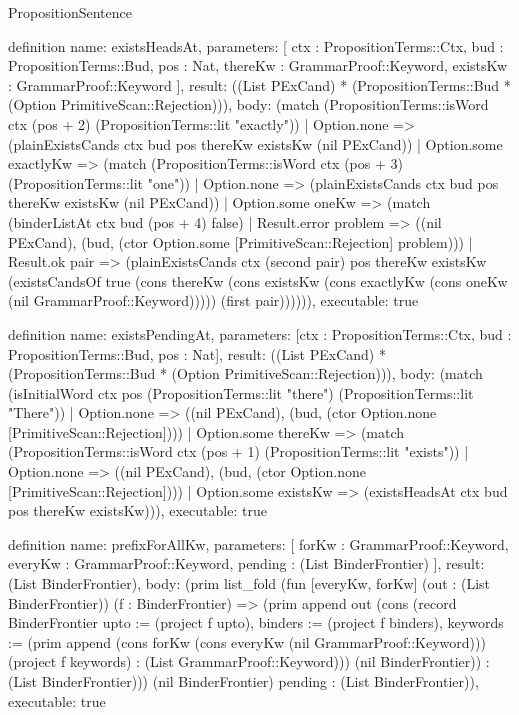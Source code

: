 \begin{lexlean}{PropositionSentence}
\begin{semanticmodule}
definition{
  name: existsHeadsAt,
  parameters: [
    ctx : PropositionTerms::Ctx,
    bud : PropositionTerms::Bud,
    pos : Nat,
    thereKw : GrammarProof::Keyword,
    existsKw : GrammarProof::Keyword
  ],
  result: ((List PExCand) * (PropositionTerms::Bud * (Option PrimitiveScan::Rejection))),
  body: (match (PropositionTerms::isWord ctx (pos + 2) (PropositionTerms::lit "exactly"))
    | Option.none => (plainExistsCands ctx bud pos thereKw existsKw (nil PExCand))
    | Option.some exactlyKw => (match (PropositionTerms::isWord ctx (pos + 3) (PropositionTerms::lit "one"))
        | Option.none => (plainExistsCands ctx bud pos thereKw existsKw (nil PExCand))
        | Option.some oneKw => (match (binderListAt ctx bud (pos + 4) false)
            | Result.error problem => ((nil PExCand), (bud, (ctor Option.some [PrimitiveScan::Rejection] problem)))
            | Result.ok pair => (plainExistsCands ctx (second pair) pos thereKw existsKw (existsCandsOf true (cons thereKw (cons existsKw (cons exactlyKw (cons oneKw (nil GrammarProof::Keyword))))) (first pair)))))),
  executable: true
}

definition{
  name: existsPendingAt,
  parameters: [ctx : PropositionTerms::Ctx, bud : PropositionTerms::Bud, pos : Nat],
  result: ((List PExCand) * (PropositionTerms::Bud * (Option PrimitiveScan::Rejection))),
  body: (match (isInitialWord ctx pos (PropositionTerms::lit "there") (PropositionTerms::lit "There"))
    | Option.none => ((nil PExCand), (bud, (ctor Option.none [PrimitiveScan::Rejection])))
    | Option.some thereKw => (match (PropositionTerms::isWord ctx (pos + 1) (PropositionTerms::lit "exists"))
        | Option.none => ((nil PExCand), (bud, (ctor Option.none [PrimitiveScan::Rejection])))
        | Option.some existsKw => (existsHeadsAt ctx bud pos thereKw existsKw))),
  executable: true
}

definition{
  name: prefixForAllKw,
  parameters: [
    forKw : GrammarProof::Keyword,
    everyKw : GrammarProof::Keyword,
    pending : (List BinderFrontier)
  ],
  result: (List BinderFrontier),
  body: (prim list_fold (fun [everyKw, forKw] (out : (List BinderFrontier)) (f : BinderFrontier) => (prim append out (cons (record BinderFrontier {upto := (project f upto), binders := (project f binders), keywords := (prim append (cons forKw (cons everyKw (nil GrammarProof::Keyword))) (project f keywords) : (List GrammarProof::Keyword))}) (nil BinderFrontier)) : (List BinderFrontier))) (nil BinderFrontier) pending : (List BinderFrontier)),
  executable: true
}


\end{semanticmodule}
\end{lexlean}
